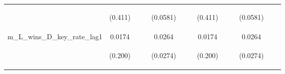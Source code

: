 \documentclass[]{article}
\begin{document}
\begin{center}
\begin{tabular}{lcccccccccccc}
\vspace{4pt} & \begin{footnotesize}(0.411)\end{footnotesize} & \begin{footnotesize}\end{footnotesize} & \begin{footnotesize}\end{footnotesize} & \begin{footnotesize}(0.0581)\end{footnotesize} & \begin{footnotesize}\end{footnotesize} & \begin{footnotesize}\end{footnotesize} & \begin{footnotesize}(0.411)\end{footnotesize} & \begin{footnotesize}\end{footnotesize} & \begin{footnotesize}\end{footnotesize} & \begin{footnotesize}(0.0581)\end{footnotesize} & \begin{footnotesize}\end{footnotesize} & \begin{footnotesize}\end{footnotesize} \\
m\_L\_wins\_D\_key\_rate\_lag1 & 0.0174 &  &  & 0.0264 &  &  & 0.0174 &  &  & 0.0264 &  &  \\
\vspace{4pt} & \begin{footnotesize}(0.200)\end{footnotesize} & \begin{footnotesize}\end{footnotesize} & \begin{footnotesize}\end{footnotesize} & \begin{footnotesize}(0.0274)\end{footnotesize} & \begin{footnotesize}\end{footnotesize} & \begin{footnotesize}\end{footnotesize} & \begin{footnotesize}(0.200)\end{footnotesize} & \begin{footnotesize}\end{footnotesize} & \begin{footnotesize}\end{footnotesize} & \begin{footnotesize}(0.0274)\end{footnotesize} & \begin{footnotesize}\end{footnotesize} & \begin{footnotesize}\end{footnotesize} \\

\end{tabular}
\end{center}
\end{document}
